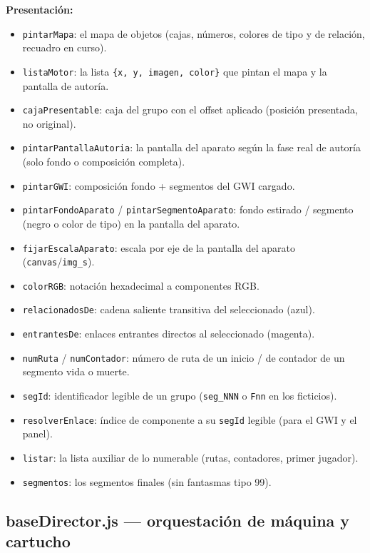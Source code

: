 \documentclass[../main.tex]{subfiles}
\begin{document}
	\textbf{Presentación:}
	\begin{itemize}
		\item \texttt{pintarMapa}: el mapa de objetos (cajas, números,
		colores de tipo y de relación, recuadro en curso).
		\item \texttt{listaMotor}: la lista \texttt{\{x, y, imagen, color\}}
		que pintan el mapa y la pantalla de autoría.
		\item \texttt{cajaPresentable}: caja del grupo con el offset aplicado
		(posición presentada, no original).
		\item \texttt{pintarPantallaAutoria}: la pantalla del aparato según
		la fase real de autoría (solo fondo o composición completa).
		\item \texttt{pintarGWI}: composición fondo + segmentos del GWI
		cargado.
		\item \texttt{pintarFondoAparato} / \texttt{pintarSegmentoAparato}:
		fondo estirado / segmento (negro o color de tipo) en la pantalla del
		aparato.
		\item \texttt{fijarEscalaAparato}: escala por eje de la pantalla del
		aparato (\texttt{canvas}/\texttt{img\_s}).
		\item \texttt{colorRGB}: notación hexadecimal a componentes RGB.
		\item \texttt{relacionadosDe}: cadena saliente transitiva del
		seleccionado (azul).
		\item \texttt{entrantesDe}: enlaces entrantes directos al
		seleccionado (magenta).
		\item \texttt{numRuta} / \texttt{numContador}: número de ruta de un
		inicio / de contador de un segmento vida o muerte.
		\item \texttt{segId}: identificador legible de un grupo
		(\texttt{seg\_NNN} o \texttt{Fnn} en los ficticios).
		\item \texttt{resolverEnlace}: índice de componente a su
		\texttt{segId} legible (para el GWI y el panel).
		\item \texttt{listar}: la lista auxiliar de lo numerable (rutas,
		contadores, primer jugador).
		\item \texttt{segmentos}: los segmentos finales (sin fantasmas
		tipo 99).
	\end{itemize}
	
	\subsection*{baseDirector.js — orquestación de máquina y cartucho}
	
\end{document}
